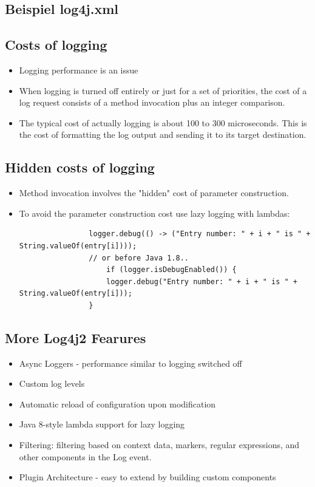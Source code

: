 \documentclass[10pt]{article}
\begin{document}
	\subsection{Beispiel log4j.xml}
	
	
	\subsection{Costs of logging}
	\begin{itemize}
		\item Logging performance is an issue
		\item When logging is turned off entirely or just for a set of priorities, the cost of a log request consists of a method invocation plus an integer comparison.
		\item The typical cost of actually logging is about 100 to 300 microseconds. This is the cost of formatting the log output and sending it to its target destination.
	\end{itemize}
	\newpage
	\subsection{Hidden costs of logging}
	\begin{itemize}
		\item Method invocation involves the "hidden" cost of parameter construction.
		\item To avoid the parameter construction cost use lazy logging with lambdas:
			\subitem \begin{verbatim}
				logger.debug(() -> ("Entry number: " + i + " is " + String.valueOf(entry[i])));
				// or before Java 1.8..
					if (logger.isDebugEnabled()) {
					logger.debug("Entry number: " + i + " is " + String.valueOf(entry[i]));
				} 
			\end{verbatim} 
	\end{itemize}
	
	\subsection{More Log4j2 Fearures}
	\begin{itemize}
		\item Async Loggers - performance similar to logging switched off
		\item Custom log levels
		\item Automatic reload of configuration upon modification
		\item Java 8-style lambda support for lazy logging
		\item Filtering: filtering based on context data, markers, regular expressions, and other components in the Log event.
		\item Plugin Architecture - easy to extend by building custom components
	\end{itemize}
	
\end{document}
